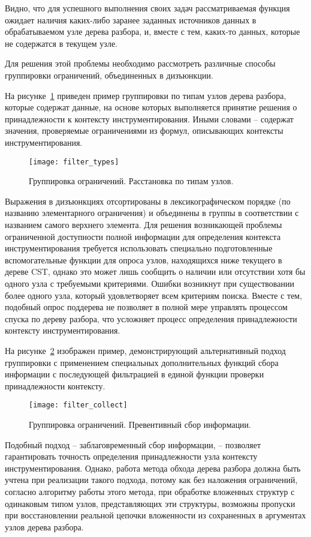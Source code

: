 Видно, что для успешного выполнения своих задач рассматриваемая функция ожидает наличия каких-либо заранее заданных источников данных в обрабатываемом узле дерева разбора, и, вместе с тем, каких-то данных, которые не содержатся в текущем узле.

Для решения этой проблемы необходимо рассмотреть различные способы группировки ограничений, объединенных в дизъюнкции.

На рисунке~\ref{fig:filter_types} приведен пример группировки по типам узлов дерева разбора, которые содержат данные, на основе которых выполняется принятие решения о принадлежности к контексту инструментирования. Иными словами -- содержат значения, проверяемые ограничениями из формул, описывающих контексты инструментирования.

\begin{figure}[!h]
	\centering
	\texttt{[image: filter\_types]}
	\caption{Группировка ограничений. Расстановка по типам узлов.}
	\label{fig:filter_types}
\end{figure}

Выражения в дизъюнкциях отсортированы в лексикографическом порядке (по названию элементарного ограничения) и объединены в группы в соответствии с названием самого верхнего элемента.
Для решения возникающей проблемы ограниченной доступности полной информации для определения контекста инструментирования требуется использовать специально подготовленные вспомогательные функции для опроса узлов, находящихся ниже текущего в дереве CST, однако это может лишь сообщить о наличии или отсутствии хотя бы одного узла с требуемыми критериями.
Ошибки возникнут при существовании более одного узла, который удовлетворяет всем критериям поиска.
Вместе с тем, подобный опрос поддерева не позволяет в полной мере управлять процессом спуска по дереву разбора, что усложняет процесс определения принадлежности контексту инструментирования.

На рисунке~\ref{fig:filter_collect} изображен пример, демонстрирующий альтернативный подход группировки с применением специальных дополнительных функций сбора информации с последующей фильтрацией в единой функции проверки принадлежности контексту.

\begin{figure}[!h]
	\centering
	\texttt{[image: filter\_collect]}
	\caption{Группировка ограничений. Превентивный сбор информации.}
	\label{fig:filter_collect}
\end{figure}

Подобный подход -- заблаговременный сбор информации, -- позволяет гарантировать точность определения принадлежности узла контексту инструментирования.
Однако, работа метода обхода дерева разбора должна быть учтена при реализации такого подхода, потому как без наложения ограничений, согласно алгоритму работы этого метода, при обработке вложенных структур с одинаковым типом узлов, представляющих эти структуры, возможны пропуски при восстановлении реальной цепочки вложенности из сохраненных в аргументах узлов дерева разбора.


